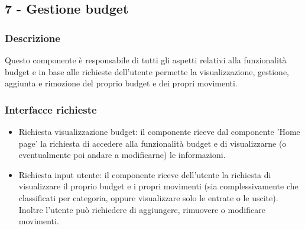 \documentclass[a4paper,12pt]{article}
\begin{document}
\subsection*{7 -  Gestione budget}
\subsubsection*{Descrizione}
Questo componente è responsabile di tutti gli aspetti relativi alla funzionalità budget e in base alle richieste dell'utente permette la visualizzazione, gestione, aggiunta e rimozione del proprio budget e dei propri movimenti.
\subsubsection*{Interfacce richieste}
\begin{itemize} \setlength\itemsep{0.01em}.
\item {\sffamily Richiesta visualizzazione budget}: il componente riceve dal componente 'Home page'  la richiesta di accedere alla funzionalità budget e di visualizzarne (o eventualmente poi andare a modificarne) le informazioni.
\item {\sffamily Richiesta input utente}: il componente riceve dell'utente la richiesta di visualizzare il proprio budget e i propri movimenti (sia complessivamente che classificati per categoria, oppure visualizzare solo le entrate o le uscite). Inoltre l'utente può richiedere di aggiungere, rimuovere o modificare movimenti.

\end{itemize}
\end{document}

